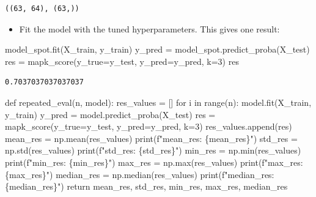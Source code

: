 \documentclass[
  letterpaper,
  DIV=11,
  numbers=noendperiod]{scrreprt}
\newenvironment{Shaded}{\begin{snugshade}}{\end{snugshade}}
\newcommand{\BuiltInTok}[1]{\textcolor[rgb]{0.00,0.23,0.31}{#1}}
\newcommand{\ControlFlowTok}[1]{\textcolor[rgb]{0.00,0.23,0.31}{#1}}
\newcommand{\DecValTok}[1]{\textcolor[rgb]{0.68,0.00,0.00}{#1}}
\newcommand{\KeywordTok}[1]{\textcolor[rgb]{0.00,0.23,0.31}{#1}}
\newcommand{\NormalTok}[1]{\textcolor[rgb]{0.00,0.23,0.31}{#1}}
\newcommand{\OperatorTok}[1]{\textcolor[rgb]{0.37,0.37,0.37}{#1}}
\newcommand{\SpecialCharTok}[1]{\textcolor[rgb]{0.37,0.37,0.37}{#1}}
\newcommand{\SpecialStringTok}[1]{\textcolor[rgb]{0.13,0.47,0.30}{#1}}
\providecommand{\tightlist}{%
  \setlength{\itemsep}{0pt}\setlength{\parskip}{0pt}}\usepackage{longtable,booktabs,array}
\begin{document}
\begin{verbatim}
((63, 64), (63,))
\end{verbatim}

\begin{itemize}
\tightlist
\item
  Fit the model with the tuned hyperparameters. This gives one result:
\end{itemize}

\begin{Shaded}
\begin{Highlighting}[]
\NormalTok{model\_spot.fit(X\_train, y\_train)}
\NormalTok{y\_pred }\OperatorTok{=}\NormalTok{ model\_spot.predict\_proba(X\_test)}
\NormalTok{res }\OperatorTok{=}\NormalTok{ mapk\_score(y\_true}\OperatorTok{=}\NormalTok{y\_test, y\_pred}\OperatorTok{=}\NormalTok{y\_pred, k}\OperatorTok{=}\DecValTok{3}\NormalTok{)}
\NormalTok{res}
\end{Highlighting}
\end{Shaded}

\begin{verbatim}
0.7037037037037037
\end{verbatim}

\begin{Shaded}
\begin{Highlighting}[]
\KeywordTok{def}\NormalTok{ repeated\_eval(n, model):}
\NormalTok{    res\_values }\OperatorTok{=}\NormalTok{ []}
    \ControlFlowTok{for}\NormalTok{ i }\KeywordTok{in} \BuiltInTok{range}\NormalTok{(n):}
\NormalTok{        model.fit(X\_train, y\_train)}
\NormalTok{        y\_pred }\OperatorTok{=}\NormalTok{ model.predict\_proba(X\_test)}
\NormalTok{        res }\OperatorTok{=}\NormalTok{ mapk\_score(y\_true}\OperatorTok{=}\NormalTok{y\_test, y\_pred}\OperatorTok{=}\NormalTok{y\_pred, k}\OperatorTok{=}\DecValTok{3}\NormalTok{)}
\NormalTok{        res\_values.append(res)}
\NormalTok{    mean\_res }\OperatorTok{=}\NormalTok{ np.mean(res\_values)}
    \BuiltInTok{print}\NormalTok{(}\SpecialStringTok{f"mean\_res: }\SpecialCharTok{\{}\NormalTok{mean\_res}\SpecialCharTok{\}}\SpecialStringTok{"}\NormalTok{)}
\NormalTok{    std\_res }\OperatorTok{=}\NormalTok{ np.std(res\_values)}
    \BuiltInTok{print}\NormalTok{(}\SpecialStringTok{f"std\_res: }\SpecialCharTok{\{}\NormalTok{std\_res}\SpecialCharTok{\}}\SpecialStringTok{"}\NormalTok{)}
\NormalTok{    min\_res }\OperatorTok{=}\NormalTok{ np.}\BuiltInTok{min}\NormalTok{(res\_values)}
    \BuiltInTok{print}\NormalTok{(}\SpecialStringTok{f"min\_res: }\SpecialCharTok{\{}\NormalTok{min\_res}\SpecialCharTok{\}}\SpecialStringTok{"}\NormalTok{)}
\NormalTok{    max\_res }\OperatorTok{=}\NormalTok{ np.}\BuiltInTok{max}\NormalTok{(res\_values)}
    \BuiltInTok{print}\NormalTok{(}\SpecialStringTok{f"max\_res: }\SpecialCharTok{\{}\NormalTok{max\_res}\SpecialCharTok{\}}\SpecialStringTok{"}\NormalTok{)}
\NormalTok{    median\_res }\OperatorTok{=}\NormalTok{ np.median(res\_values)}
    \BuiltInTok{print}\NormalTok{(}\SpecialStringTok{f"median\_res: }\SpecialCharTok{\{}\NormalTok{median\_res}\SpecialCharTok{\}}\SpecialStringTok{"}\NormalTok{)}
    \ControlFlowTok{return}\NormalTok{ mean\_res, std\_res, min\_res, max\_res, median\_res}
\end{Highlighting}
\end{Shaded}
\end{document}
